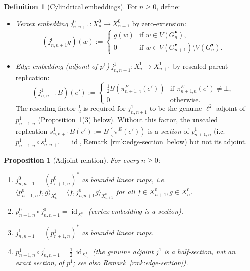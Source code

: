 \documentclass[11pt, a4paper]{amsart}
\newtheorem{proposition}[theorem]{Proposition}
\theoremstyle{definition}
\newtheorem{definition}[theorem]{Definition}
\newcommand{\id}{\operatorname{id}}
\begin{document}
\begin{definition}[Cylindrical embeddings]
\label{def:j}
For $n \geq 0$, define:
\begin{itemize}
\item \emph{Vertex embedding} $j_{n, n+1}^0 \colon X_n^0 \to
  X_{n+1}^0$ by zero-extension:
  \[
    (j_{n, n+1}^0 g)(w) := \begin{cases} g(w) & \text{if } w \in
      V(G_n^\bullet), \\ 0 & \text{if } w \in V(G_{n+1}^\bullet)
      \setminus V(G_n^\bullet). \end{cases}
  \]
\item \emph{Edge embedding (adjoint of $p^1$)}
  $j_{n, n+1}^1 \colon X_n^1 \to X_{n+1}^1$ by rescaled
  parent-replication:
  \[
    (j_{n, n+1}^1 B)(e') := \begin{cases}
      \tfrac{1}{2} B(\pi_{n+1, n}^E(e'))
        & \text{if } \pi_{n+1, n}^E(e') \neq \bot, \\
      0 & \text{otherwise.}
    \end{cases}
  \]
  The rescaling factor $\tfrac{1}{2}$ is required for $j_{n, n+1}^1$
  to be the genuine $\ell^2$-adjoint of $p_{n+1, n}^1$
  (Proposition~\ref{prop:adjoints}(3) below). Without this factor,
  the unscaled replication $s_{n, n+1}^1 B(e') := B(\pi^E(e'))$ is a
  \emph{section} of $p_{n+1, n}^1$ (i.e.\
  $p_{n+1, n}^1 \circ s_{n, n+1}^1 = \id$,
  Remark~\ref{rmk:edge-section} below) but not its adjoint.
\end{itemize}
\end{definition}

\begin{proposition}[Adjoint relation]
\label{prop:adjoints}
For every $n \geq 0$:
\begin{enumerate}
\item $j_{n, n+1}^0 = (p_{n+1, n}^0)^*$ as bounded linear maps,
  i.e.\ $\langle p_{n+1, n}^0 f, g \rangle_{X_n^0} = \langle f,
  j_{n, n+1}^0 g \rangle_{X_{n+1}^0}$ for all $f \in X_{n+1}^0,
  g \in X_n^0$.
\item $p_{n+1, n}^0 \circ j_{n, n+1}^0 = \id_{X_n^0}$ (vertex
  embedding is a section).
\item $j_{n, n+1}^1 = (p_{n+1, n}^1)^*$ as bounded linear maps.
\item $p_{n+1, n}^1 \circ j_{n, n+1}^1 = \tfrac{1}{2}\,\id_{X_n^1}$
  (the genuine adjoint $j^1$ is a half-section, not an exact
  section, of $p^1$; see also
  Remark~\ref{rmk:edge-section}).
\end{enumerate}
\end{proposition}
\end{document}
